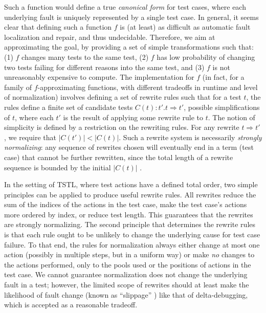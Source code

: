 Such a function would define a true \emph{canonical form} for test
cases, where each underlying fault is uniquely represented by a single
test case.  In general, it seems clear that defining such a function
$f$ is (at least) as difficult as automatic fault localization and
repair, and thus undecidable.  Therefore, we aim at approximating the
goal, by providing a set of simple transformations such that: (1) $f$
changes many tests to the same test, (2) $f$ has low probability of
changing two tests failing for different reasons into the same test,
and (3) $f$ is not unreasonably expensive to compute.  The implementation
for $f$ (in fact, for a family of $f$-approximating functions, with
different tradeoffs in runtime and level of normalization) involves
defining a set of rewrite rules such that for a test $t$, the rules
define a finite set of candidate tests $C(t): t' . t \Rightarrow t'$, possible
simplifications of $t$, where each $t'$ is the result of applying some
rewrite rule to $t$.  The notion of simplicity is defined by a
restriction on the rewriting rules.  For any rewrite $t \Rightarrow t'$, we require that $|C(t')| < |C(t)|$.  Such
a rewrite system is necessarily \emph{strongly normalizing}: any
sequence of rewrites chosen will eventually end in a term (test case)
that cannot be further rewritten, since the total length of a rewrite
sequence is bounded by the initial $|C(t)|$ \cite{term1}.


In the setting of TSTL, where test actions have a defined total
order, two simple principles can be applied to produce useful
rewrite rules.  All rewrites reduce the sum of the
indices of the actions in the test case, make the test case's
actions more ordered by index, or reduce test length.  This guarantees that the rewrites are
strongly normalizing.
The second principle that determines the rewrite rules is that each
rule ought to be unlikely to change the underlying cause for test case
failure.  To that end, the rules for normalization always either change at most
one action (possibly in multiple steps, but in a uniform way) or make
\emph{no} changes to the actions performed, only to the pools used or the
positions of actions in the test case.  We cannot guarantee
normalization does not change the underlying fault in a test; however,
the limited scope of rewrites should at least make the likelihood of
fault change (known as ``slippage'' \cite{PLDI13}) like that of
delta-debugging, which is accepted as a reasonable tradeoff.

